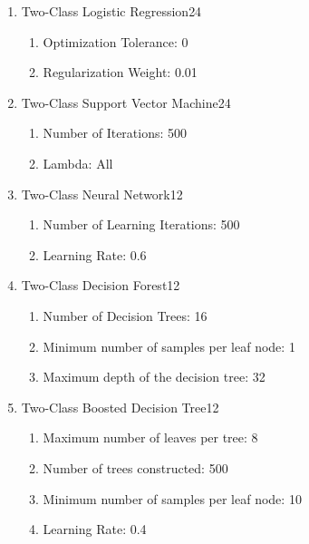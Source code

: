 \begin{enumerate}
    \item{Two-Class Logistic Regression}24
    
    \begin{enumerate}
        \item{Optimization Tolerance:} 0
        \item{Regularization Weight:} 0.01
    \end{enumerate}
    
    \item{Two-Class Support Vector Machine}24
    
    \begin{enumerate}
        \item{Number of Iterations:} 500
        \item{Lambda:} All
    \end{enumerate}
    
    \item{Two-Class Neural Network}12
    
    \begin{enumerate}
        \item{Number of Learning Iterations:} 500
        \item{Learning Rate:} 0.6
    \end{enumerate}
    
    \item{Two-Class Decision Forest}12

    \begin{enumerate}
        \item{Number of Decision Trees:} 16
        \item{Minimum number of samples per leaf node:} 1
        \item{Maximum depth of the decision tree:} 32
    \end{enumerate}
    
    \item{Two-Class Boosted Decision Tree}12
    
    \begin{enumerate}
        \item{Maximum number of leaves per tree:} 8
        \item{Number of trees constructed:} 500
        \item{Minimum number of samples per leaf node:} 10
        \item{Learning Rate:} 0.4
    \end{enumerate}
    
\end{enumerate}

